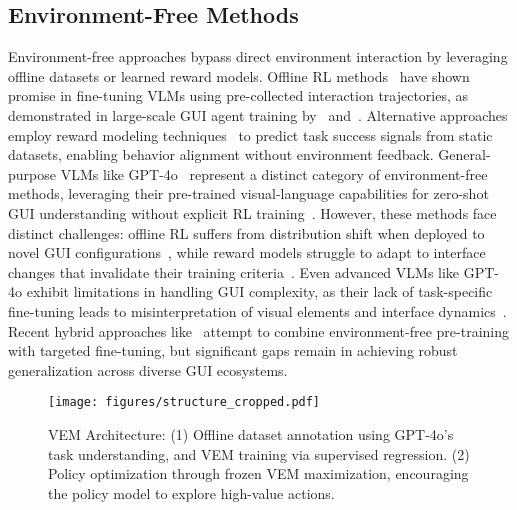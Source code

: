 \subsection{Environment-Free Methods}
Environment-free approaches bypass direct environment interaction by leveraging offline datasets or learned reward models. Offline RL methods~\cite{snell2022offline,hong2023zero} have shown promise in fine-tuning VLMs using pre-collected interaction trajectories, as demonstrated in large-scale GUI agent training by~\cite{wang2024large} and~\cite{bai2024digirl}. Alternative approaches employ reward modeling techniques~\cite{stiennon2020learning,ouyang2022training} to predict task success signals from static datasets, enabling behavior alignment without environment feedback. General-purpose VLMs like GPT-4o~\cite{GPT-4o} represent a distinct category of environment-free methods, leveraging their pre-trained visual-language capabilities for zero-shot GUI understanding without explicit RL training~\cite{yan2023gpt,zhang2023appagent}. However, these methods face distinct challenges: offline RL suffers from distribution shift when deployed to novel GUI configurations~\cite{levine2020offline}, while reward models struggle to adapt to interface changes that invalidate their training criteria~\cite{prudencio2023survey}. Even advanced VLMs like GPT-4o exhibit limitations in handling GUI complexity, as their lack of task-specific fine-tuning leads to misinterpretation of visual elements and interface dynamics~\cite{xie2024osworld,zhang2024ufo}. Recent hybrid approaches like~\cite{cheng2024seeclick} attempt to combine environment-free pre-training with targeted fine-tuning, but significant gaps remain in achieving robust generalization across diverse GUI ecosystems.

\begin{figure*}[htb]
    \centering
    \texttt{[image: figures/structure\_cropped.pdf]}
    \caption{VEM Architecture: (1) Offline dataset annotation using GPT-4o's task understanding, and VEM training via supervised regression. (2) Policy optimization through frozen VEM maximization, encouraging the policy model to explore high-value actions.}
    \label{fig:structure}
    \vspace{-3mm}
\end{figure*}


